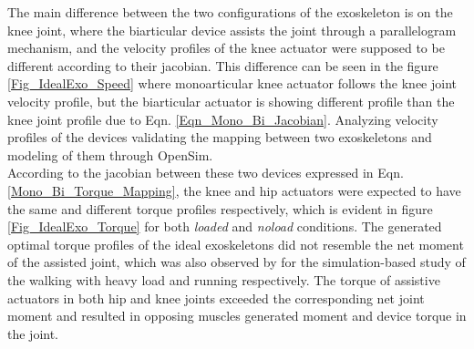 \documentclass[10pt,letterpaper]{article}
\begin{document}
The main difference between the two configurations of the exoskeleton is on the knee joint, where the biarticular device assists the joint through a parallelogram mechanism, and the velocity profiles of the knee actuator were supposed to be different according to their jacobian. This difference can be seen in the figure \ref{Fig_IdealExo_Speed} where monoarticular knee actuator follows the knee joint velocity profile, but the biarticular actuator is showing different profile than the knee joint profile due to Eqn. \eqref{Eqn_Mono_Bi_Jacobian}. Analyzing velocity profiles of the devices validating the mapping between two exoskeletons and modeling of them through OpenSim.\\
According to the jacobian between these two devices expressed in Eqn. \ref{Mono_Bi_Torque_Mapping}, the knee and hip actuators were expected to have the same and different torque profiles respectively, which is evident in figure \ref{Fig_IdealExo_Torque} for both \textit{loaded} and \textit{noload} conditions. The generated optimal torque profiles of the ideal exoskeletons did not resemble the net moment of the assisted joint, which was also observed by \cite{93,2} for the simulation-based study of the walking with heavy load and running respectively. The torque of assistive actuators in both hip and knee joints exceeded the corresponding net joint moment and resulted in opposing muscles generated moment and device torque in the joint.\\
\end{document}
